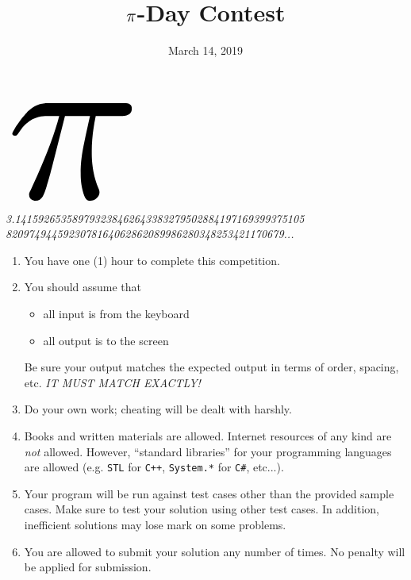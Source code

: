 \documentclass{contest-set}
\title{$\scaleobj{1.5}{\pi}$-Day Contest}
\date{March 14, 2019}
\institute{Stephen Lewis Secondary School}
\begin{document}
\makeatletter
\begin{titlepage}
	\centering
	{\itshape\LARGE\@institute\par}
	\vspace{1cm}
	{\scshape\Large\@organization\par}
	\vfill
	{{
	$\scaleobj{20}{\pi}$}\par}
	\vspace{2ex}
	{\parbox{0.8\linewidth}{\centering\scriptsize\itshape \textcolor{black!50}{3.141592653589793238462643383279502884197169399375105 
8209749445923078164062862089986280348253421170679...}} \par}
	\vspace{1.5cm}
    {\huge\bfseries \@title\par}
    \vspace{2ex}
	{\large \@date\par}
	\vfill
\end{titlepage}
\makeatother

\maketitle
\vspace{3ex}
\begin{enumerate}[listparindent=\parindent, labelwidth=!, labelindent=0pt]
    \item You have one (1) hour to complete this competition.
    \item You should assume that 
    \begin{itemize}
        \item all input is from the keyboard
        \item all output is to the screen
    \end{itemize}
    Be sure your output matches the expected output in terms of order, spacing, etc. \textit{IT MUST
    MATCH EXACTLY!}
    \item Do your own work; cheating will be dealt with harshly.
    \item Books and written materials are allowed. Internet resources of any kind are \textit{not} allowed. However, ``standard libraries'' for your programming languages are allowed (e.g. \texttt{STL} for \texttt{C++}, \texttt{System.*} for \texttt{C\#}, etc...).
    \item Your program will be run against test cases other than the provided sample cases.  Make sure to test your solution using other test cases. In addition, inefficient solutions may lose mark on some problems.
    \item You are allowed to submit your solution any number of times. No penalty will be applied for submission.
\end{enumerate}
\end{document}
